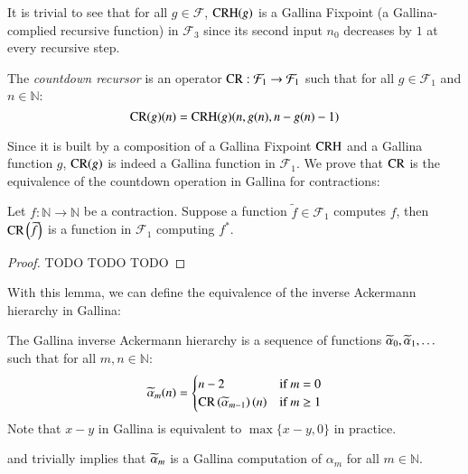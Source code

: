 It is trivial to see that for all $g\in \mathcal{F}$, $\text{CRH}(g)$ is a Gallina Fixpoint (a Gallina-complied recursive function) in $\mathcal{F}_3$ since its second input $n_0$ decreases by $1$ at every recursive step.

\begin{defn} \label{defn: countdown rec}
The \textit{countdown recursor} is an operator $\text{CR} : \mathcal{F}_1 \to \mathcal{F}_1$ such that for all $g\in \mathcal{F}_1$ and $n\in \mathbb{N}$:
\begin{equation}
\text{CR}(g)(n) = \text{CRH}(g)(n, g(n), n - g(n) - 1)
\end{equation}
\end{defn}

Since it is built by a composition of a Gallina Fixpoint $\text{CRH}$ and a Gallina function $g$, $\text{CR}(g)$ is indeed a Gallina function in $\mathcal{F}_1$. We prove that $\text{CR}$ is the equivalence of the countdown operation in Gallina for contractions:

\begin{lem} \label{lem: CRH_countdown}
Let $f: \mathbb{N}\to \mathbb{N}$ be a contraction. Suppose a function $\widetilde{f}\in \mathcal{F}_1$ computes $f$, then $\text{CR}\left(\widetilde{f}\right)$ is a function in $\mathcal{F}_1$ computing $f^*$.
\end{lem}

\begin{proof}
TODO TODO TODO
\end{proof}

With this lemma, we can define the equivalence of the inverse Ackermann hierarchy in Gallina:

\begin{defn}
The Gallina inverse Ackermann hierarchy is a sequence of functions $\widetilde{\alpha}_0, \widetilde{\alpha}_1, \ldots $ such that for all $m, n\in \mathbb{N}$:
\begin{equation}
\widetilde{\alpha}_m(n) = \begin{cases}
n - 2 & \text{if } m = 0 \\ \text{CR}\left(\widetilde{\alpha}_{m-1}\right)(n) & \text{if } m \ge 1
\end{cases}
\end{equation}
Note that $x-y$ in Gallina is equivalent to $\max\{x-y, 0\}$ in practice.
\end{defn}

 and  trivially implies that $\widetilde{\alpha}_m$ is a Gallina computation of $\alpha_m$ for all $m\in \mathbb{N}$.

